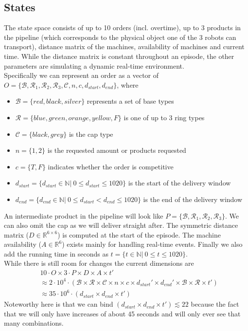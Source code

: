 \documentclass[runningheads,envcountsect]{llncs}
\begin{document}
\subsection{States} \label{states}
The state space consists of up to 10 orders (incl. overtime), up to 3 products in the pipeline (which corresponds to the physical object one of the 3 robots can transport), distance matrix of the machines, availability of machines and current time. While the distance matrix is constant throughout an episode, the other parameters are simulating a dynamic real-time environment.\\
Specifically we can represent an order as a vector of $O=\{\mathcal{B}, \mathcal{R}_1, \mathcal{R}_2, \mathcal{R}_3, \mathcal{C}, n, c, d_{start}, d_{end}  \}$, where
\begin{itemize}
  \item $\mathcal{B}=\{red, black, silver\}$ represents a set of base types
  \item $\mathcal{R}=\{blue, green, orange, yellow, F\}$ is one of up to 3 ring types
  \item $\mathcal{C}=\{black, grey\}$ is the cap type
  \item $n = \{1,2\}$ is the requested amount or products requested
  \item $c = \{T, F\}$ indicates whether the order is competitive
  \item $d_{start} = \{d_{start} \in \mathbb{N}|\ 0 \leq d_{start} \leq 1020 \}$ is the start of the delivery window
  \item $d_{end} = \{d_{end} \in \mathbb{N}|\ 0 \leq d_{start} < d_{end} \leq 1020 \}$ is the end of the delivery window
\end{itemize}
An intermediate product in the pipeline will look like $P=\{\mathcal{B}, \mathcal{R}_1, \mathcal{R}_2, \mathcal{R}_3\}$. We can also omit the cap as we will deliver straight after.
The symmetric distance matrix ($D \in \mathbb{R}^{6 \times 6}$) is computed at the start of the episode. 
The machine availability ($A \in \mathbb{R}^6$) exists mainly for handling real-time events.
Finally we also add the running time in seconds as $t = \{t \in \mathbb{N}|\ 0 \leq t \leq 1020 \}$.\\
While there is still room for changes the current dimensions are
\begin{align*}
&10 \cdot O \times 
3 \cdot P \times 
D \times
A \times
t' \\
&\approx 2 \cdot 10^4 \cdot (
\mathcal{B} \times 
\mathcal{R} \times 
\mathcal{C} \times 
n \times 
c \times 
d_{start}' \times 
d_{end}' \times 
\mathcal{B} \times
\mathcal{R} \times 
t' )\\
&\approx 35 \cdot 10^6 \cdot (d_{start} \times d_{end} \times t')
\end{align*}
Noteworthy here is that we can bind $(d_{start} \times d_{end} \times t') \lesssim 22$ because the fact that we will only have increases of about 45 seconds and will only ever see that many combinations.
\end{document}
